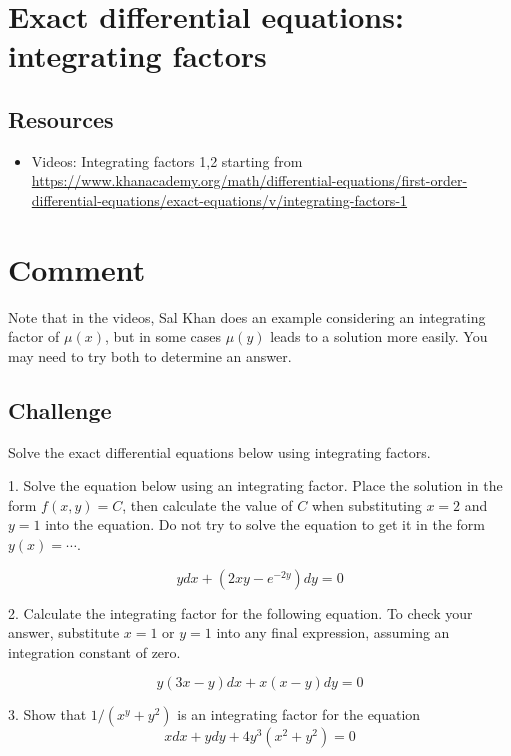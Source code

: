 \section{Exact differential equations: integrating factors}
\label{sec:edeif}

\subsection*{Resources}
\begin{itemize}
    \item Videos: Integrating factors 1,2 starting from \url{https://www.khanacademy.org/math/differential-equations/first-order-differential-equations/exact-equations/v/integrating-factors-1}
\end{itemize}

\section*{Comment}
Note that in the videos, Sal Khan does an example considering an integrating factor of $\mu(x)$, but in some cases $\mu(y)$ leads to a solution more easily. You may need to try both to determine an answer.

\subsection*{Challenge}
Solve the exact differential equations below using integrating factors.

1. Solve the equation below using an integrating factor. Place the solution in the form $f(x,y) = C$, then calculate the value of $C$ when substituting $x=2$ and $y=1$ into the equation. Do not try to solve the equation to get it in the form $y(x)=\cdots$.

\begin{equation}
    \label{eq:edeif1}
    y dx + (2 x y - e^{-2 y}) dy = 0
\end{equation}

2. Calculate the integrating factor for the following equation. To check your answer, substitute $x=1$ or $y=1$ into any final expression, assuming an integration constant of zero.

\begin{equation}
    \label{eq:edeif2}
    y(3x-y) dx + x(x-y)dy = 0
\end{equation}

3. Show that $1/(x^y+y^2)$ is an integrating factor for the equation
\begin{equation}
    x dx + y dy + 4 y^3 (x^2 + y^2) = 0
\end{equation}

